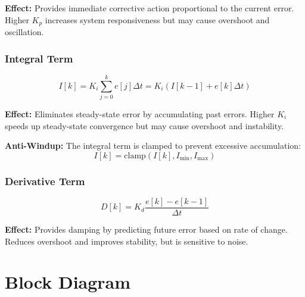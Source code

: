 \documentclass[11pt,a4paper]{article}
\begin{document}
\textbf{Effect:} Provides immediate corrective action proportional to the current error. Higher $K_p$ increases system responsiveness but may cause overshoot and oscillation.

\subsubsection{Integral Term}

\begin{equation}
I[k] = K_i \sum_{j=0}^{k} e[j] \Delta t = K_i \left( I[k-1] + e[k] \Delta t \right)
\end{equation}

\textbf{Effect:} Eliminates steady-state error by accumulating past errors. Higher $K_i$ speeds up steady-state convergence but may cause overshoot and instability.

\textbf{Anti-Windup:} The integral term is clamped to prevent excessive accumulation:
\begin{equation}
I[k] = \text{clamp}(I[k], I_{\min}, I_{\max})
\end{equation}

\subsubsection{Derivative Term}

\begin{equation}
D[k] = K_d \frac{e[k] - e[k-1]}{\Delta t}
\end{equation}

\textbf{Effect:} Provides damping by predicting future error based on rate of change. Reduces overshoot and improves stability, but is sensitive to noise.

\section{Block Diagram}
\end{document}
